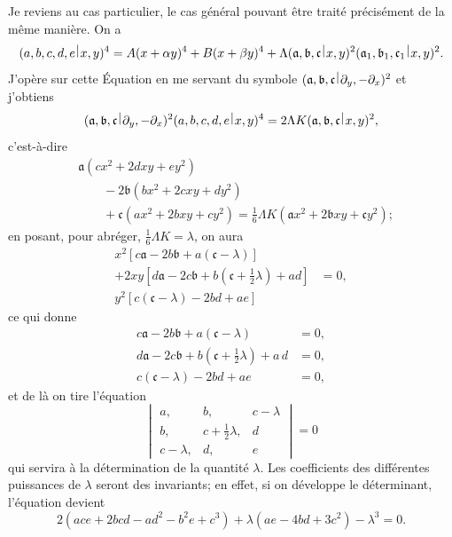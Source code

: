 \documentclass[11pt,a4paper]{book}
\theoremstyle{plain}
\newcommand{\wrule}{\hspace{-0.1em}\mid\hspace{-0.1em}}
\begin{document}
Je reviens au cas particulier, le cas g\'{e}n\'{e}ral pouvant \^{e}tre trait\'{e} pr\'{e}cis\'{e}ment de la m\^{e}me mani\`{e}re. On a
\[
(a,b,c,d,e\,\raisebox{0.5ex}{$\wrule$}\,x,y)^4=A(x+\alpha y)^4+B(x+\beta y)^4+\Lambda(\mathfrak{a},\mathfrak{b},\mathfrak{c}\,\raisebox{0.5ex}{$\wrule$}\,x,y)^2(\mathfrak{a}_1,\mathfrak{b}_1,\mathfrak{c}_1\,\raisebox{0.5ex}{$\wrule$}\,x,y)^2.
\]
J'op\`{e}re sur cette \'{E}quation en me servant du symbole $(\mathfrak{a},\mathfrak{b},\mathfrak{c}\,\raisebox{0.5ex}{$\wrule$}\,\partial_y,-\partial_x)^2$ et j'obtiens
\[
(\mathfrak{a},\mathfrak{b},\mathfrak{c}\,\raisebox{0.5ex}{$\wrule$}\,\partial_y,-\partial_x)^2(a,b,c,d,e\,\raisebox{0.5ex}{$\wrule$}\,x,y)^4=2\Lambda K(\mathfrak{a},\mathfrak{b},\mathfrak{c}\,\raisebox{0.5ex}{$\wrule$}\,x,y)^2,
\]
c'est-\`{a}-dire
\begin{align*}
&\mathfrak{a}(c x^2+2d xy+e y^2)\\
&\qquad -2\mathfrak{b}(b x^2+2c xy+d y^2)\\
&\qquad +\mathfrak{c}(a x^2+2b xy+c y^2)=\tfrac{1}{6}\Lambda K(\mathfrak{a} x^2+2\mathfrak{b} xy+\mathfrak{c} y^2);
\end{align*}
en posant, pour abr\'{e}ger, $\tfrac{1}{6}\Lambda K=\lambda$, on aura
\begin{align*}
x^2[c\mathfrak{a}-2b\mathfrak{b}+a(\mathfrak{c}-\lambda)] &\\
+2xy[d\mathfrak{a}-2c\mathfrak{b}+b(\mathfrak{c}+\tfrac{1}{2}\lambda)+a d] &= 0,\\
y^2[c(\mathfrak{c}-\lambda)-2b d+a e] &
\end{align*}
ce qui donne
\begin{align*}
c\mathfrak{a}-2b\mathfrak{b}+a(\mathfrak{c}-\lambda) &= 0,\\
d\mathfrak{a}-2c\mathfrak{b}+b(\mathfrak{c}+\tfrac{1}{2}\lambda)+a\,d &= 0,\\
c(\mathfrak{c}-\lambda)-2b d+a e &= 0,
\end{align*}
et de l\`{a} on tire l'\'{e}quation
\[
\begin{vmatrix}
a, & b, & c-\lambda\\
b, & c+\tfrac{1}{2}\lambda, & d\\
c-\lambda, & d, & e
\end{vmatrix}=0
\]
qui servira \`{a} la d\'{e}termination de la quantit\'{e} $\lambda$. Les coefficients des diff\'{e}rentes puissances de $\lambda$ seront des invariants; en effet, si on d\'{e}veloppe le d\'{e}terminant, l'\'{e}quation devient
\[
2(ace+2bcd-ad^2-b^2 e+c^3)+\lambda(ae-4bd+3c^2)-\lambda^3=0.
\]
\end{document}
